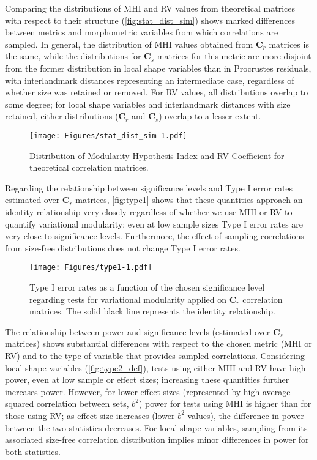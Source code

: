 \documentclass[12pt,twoside]{report}
\begin{document}
Comparing the distributions of MHI and RV values from theoretical
matrices with respect to their structure (\autoref{fig:stat_dist_sim})
shows marked differences between metrics and morphometric variables from
which correlations are sampled. In general, the distribution of MHI
values obtained from $\mathbf{C}_r$ matrices is the same, while the
distributions for $\mathbf{C}_s$ matrices for this metric are more
disjoint from the former distribution in local shape variables than in
Procrustes residuals, with interlandmark distances representing an
intermediate case, regardless of whether size was retained or removed.
For RV values, all distributions overlap to some degree; for local shape
variables and interlandmark distances with size retained, either
distributions ($\mathbf{C}_r$ and $\mathbf{C}_s$) overlap to a lesser
extent.

\begin{figure}[htbp]
\centering
\texttt{[image: Figures/stat\_dist\_sim-1.pdf]}
\caption{Distribution of Modularity Hypothesis Index and RV Coefficient
for theoretical correlation matrices. \label{fig:stat_dist_sim}}
\end{figure}

Regarding the relationship between significance levels and Type I error
rates estimated over $\mathbf{C}_r$ matrices, \autoref{fig:type1} shows
that these quantities approach an identity relationship very closely
regardless of whether we use MHI or RV to quantify variational
modularity; even at low sample sizes Type I error rates are very close
to significance levels. Furthermore, the effect of sampling correlations
from size-free distributions does not change Type I error rates.

\begin{figure}[htbp]
\centering
\texttt{[image: Figures/type1-1.pdf]}
\caption{Type I error rates as a function of the chosen significance
level regarding tests for variational modularity applied on
$\mathbf{C}_r$ correlation matrices. The solid black line represents the
identity relationship. \label{fig:type1}}
\end{figure}

The relationship between power and significance levels (estimated over
$\mathbf{C}_s$ matrices) shows substantial differences with respect to
the chosen metric (MHI or RV) and to the type of variable that provides
sampled correlations. Considering local shape variables
(\autoref{fig:type2_def}), tests using either MHI and RV have high
power, even at low sample or effect sizes; increasing these quantities
further increases power. However, for lower effect sizes (represented by
high average squared correlation between sets, $b^2$) power for tests
using MHI is higher than for those using RV; as effect size increases
(lower $b^2$ values), the difference in power between the two statistics
decreases. For local shape variables, sampling from its associated
size-free correlation distribution implies minor differences in power
for both statistics.
\end{document}
